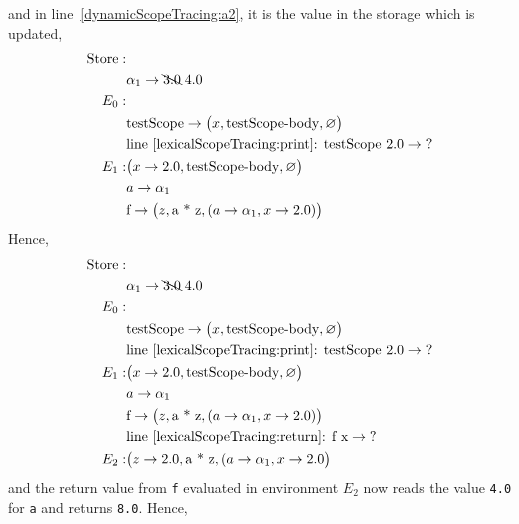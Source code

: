 and in line~\ref{dynamicScopeTracing:a2}, it is the value in the storage which is updated,
\begin{align*}
  \text{Store}: &\\
  & \alpha_1 \rightarrow \bcancel{3.0}\; 4.0\\
  E_0:&\\
      &\text{testScope} \rightarrow \big(x, \text{testScope-body}, \varnothing\big)\\
      & \text{line~\ref{lexicalScopeTracing:print}: testScope 2.0} \rightarrow \text{?}\\
  E_1: & \big(x\rightarrow 2.0, \text{testScope-body}, \varnothing\big)\\
      & a \rightarrow \alpha_1\\
      & \text{f} \rightarrow \big(z, \text{a * z}, (a \rightarrow \alpha_1, x\rightarrow 2.0)\big)\\
\end{align*}
Hence,
\begin{align*}
  \text{Store}: &\\
  & \alpha_1 \rightarrow \bcancel{3.0}\; 4.0\\
  E_0:&\\
      &\text{testScope} \rightarrow \big(x, \text{testScope-body}, \varnothing\big)\\
      & \text{line~\ref{lexicalScopeTracing:print}: testScope 2.0} \rightarrow \text{?}\\
  E_1: & \big(x\rightarrow 2.0, \text{testScope-body}, \varnothing\big)\\
      & a \rightarrow \alpha_1\\
      & \text{f} \rightarrow \big(z, \text{a * z}, (a \rightarrow \alpha_1, x\rightarrow 2.0)\big)\\
      & \text{line~\ref{lexicalScopeTracing:return}: f x} \rightarrow \text{?}\\
  E_2: & \big(z \rightarrow 2.0, \text{a * z}, (a \rightarrow \alpha_1, x\rightarrow 2.0\big)\\
\end{align*}
and the return value from \lstinline!f! evaluated in environment $E_2$ now reads the value \lstinline!4.0! for \lstinline!a! and returns \lstinline!8.0!. Hence,
